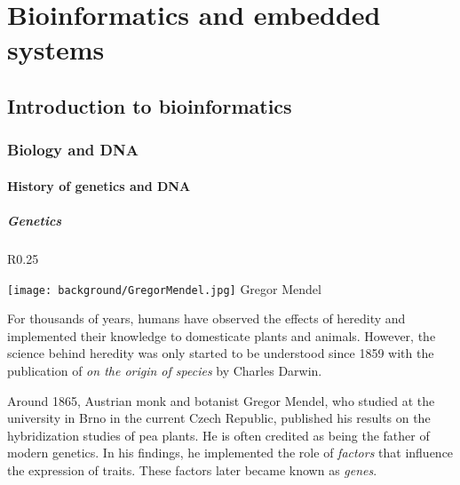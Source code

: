 
\chapter{Bioinformatics and embedded systems}

\section{Introduction to bioinformatics}

\subsection{Biology and DNA}

\subsubsection{History of genetics and DNA}

\paragraph{Genetics}

\begin{wrapfigure}{R}{0.25\textwidth}
	\begin{center}
		\texttt{[image: background/GregorMendel.jpg]}
		Gregor Mendel
	\end{center}
\end{wrapfigure}


For thousands of years, humans have observed the effects of heredity and implemented their knowledge to domesticate plants and animals. However, the science behind heredity was only started to be understood since 1859 with the publication of \emph{on the origin of species} by Charles Darwin. 

Around 1865, Austrian monk and botanist Gregor Mendel, who studied at the university in Brno in the current Czech Republic, published his results on the hybridization studies of pea plants. He is often credited as being the father of modern genetics. In his findings, he implemented the role of \emph{factors} that influence the expression of traits. These factors later became known as \emph{genes}.

